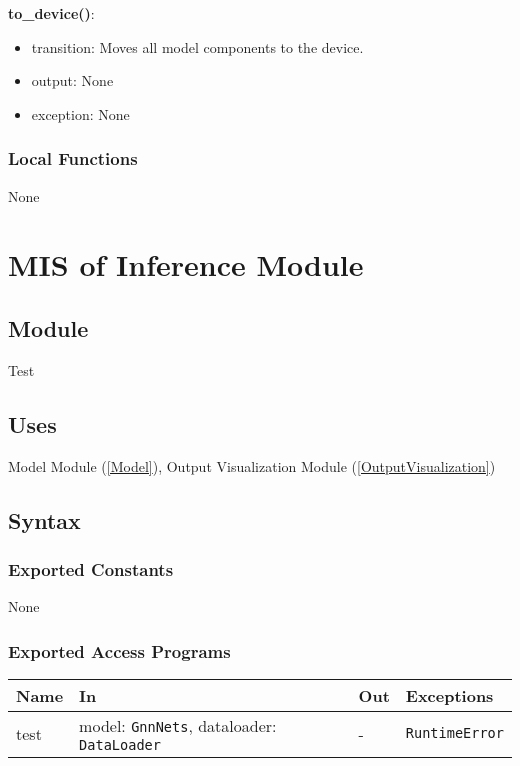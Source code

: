 \documentclass[12pt, titlepage]{article}
\begin{document}
\noindent \textbf{to\_device()}:
\begin{itemize}
  \item transition: Moves all model components to the device.
  \item output: None
  \item exception: None
\end{itemize}

\subsubsection{Local Functions}
None





\section{MIS of Inference Module} \label{Test}

\subsection{Module}
Test

\subsection{Uses}
Model Module (\ref{Model}), Output Visualization Module (\ref{OutputVisualization})

\subsection{Syntax}

\subsubsection{Exported Constants}
None

\subsubsection{Exported Access Programs}

\begin{center}
\begin{tabular}{p{2cm} p{6cm} p{4cm} p{3.5cm}}
\hline
\textbf{Name} & \textbf{In} & \textbf{Out} & \textbf{Exceptions} \\
\hline
test & model: \texttt{GnnNets}, dataloader: \texttt{DataLoader} & - & \texttt{RuntimeError} \\
\hline
\end{tabular}
\end{center}
\end{document}
